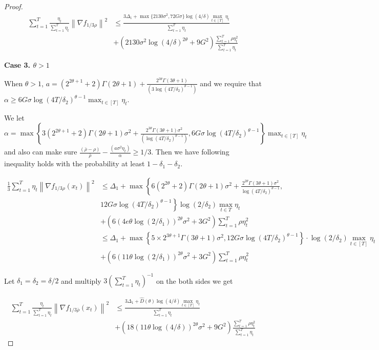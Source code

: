 \documentclass{article}
\def \brho {\bar{\rho}}
\def \sumT {\sum_{t=1}^T}
\def \nab {\nabla}
\newcommand{\norm}[2][]{\left\|#2\right\|^{#1}}
\newcommand{\Brace}[1]{\left(#1\right)}
\begin{document}
\begin{proof}
\begin{align}
    \sumT \frac{\eta_t}{\sumT\eta_t}\norm[2]{\nab f_{1/3\rho}}&\leq \frac{3\Delta_1+\max\{2130\sigma^2,72G\sigma\}\log(4/\delta)\max_{t\in[T]}\eta_t}{\sumT\eta_t}\nonumber\\
    &+ (2130\sigma^2\log(4/\delta)^{2\theta}+9G^2)\frac{\sumT\rho\eta_t^2}{\sumT\eta_t}
\end{align}

\textbf{Case 3. $\theta>1$}

When $\theta>1$, $a=(2^{2\theta+1}+2)\Gamma(2\theta+1)+\frac{2^{3\theta}\Gamma(3\theta+1)}{(3\log(4T/\delta_2)^{\theta-1})}$ and we require that $\alpha\geq 6G\sigma\log(4T/\delta_2)^{\theta-1}\max_{t\in[T]}\eta_t$. 

We let $\alpha = \max\left\{3(2^{2\theta+1}+2)\Gamma(2\theta+1)\sigma^2+\frac{2^{3\theta}\Gamma(3\theta+1)\sigma^2}{(\log(4T/\delta_2)^{\theta-1})},6G\sigma\log(4T/\delta_2)^{\theta-1}\right\}\max_{t\in[T]}\eta_t$ and also can make sure $\frac{(\brho-\rho)}{\brho} - \frac{(a\sigma^2\eta_t)}{\alpha}\geq1/3$. Then we have following inequality holds with the probability at least $1-\delta_1-\delta_2$.

\begin{align}
    \frac{1}{3}\sumT \eta_t\norm[2]{\nab f_{1/3\rho}(x_t)}&\leq \Delta_1 + \max\left\{6(2^{2\theta}+2)\Gamma(2\theta+1)\sigma^2+\frac{2^{2\theta}\Gamma(3\theta+1)\sigma^2}{\log(4T/\delta_2)^{\theta-1}}, \right.\nonumber\\
    &\left.12G\sigma\log(4T/\delta_2)^{\theta-1}\right\}\log(2/\delta_2)\max_{t\in T}\eta_t\nonumber\\
    &+\Brace{6(4e\theta\log(2/\delta_1))^{2\theta}\sigma^2+3G^2}\sumT \rho\eta_t^2\nonumber\\
    &\leq \Delta_1 + \max\left\{5\times2^{3\theta+1}\Gamma(3\theta+1)\sigma^2,12G\sigma\log(4T/\delta_2)^{\theta-1}\right\}\cdot\log(2/\delta_2)\max_{t\in[T]}\eta_t\nonumber\\
    &+ \Brace{6(11\theta\log(2/\delta_1))^{2\theta}\sigma^2+3G^2}\sumT \rho\eta_t^2
\end{align}

Let $\delta_1=\delta_2=\delta/2$ and multiply $3\Brace{\sumT\eta_t}^{-1}$ on the both sides we get

\begin{align}
    \sumT\frac{\eta_t}{\sumT\eta_t}\norm[2]{\nab f_{1/3\brho}(x_t)}&\leq\frac{3\Delta_1+\widehat{D}(\theta)\log(4/\delta)\max_{t\in[T]}\eta_t}{\sumT\eta_t}\nonumber\\
    &+ \Brace{18(11\theta\log(4/\delta))^{2\theta}\sigma^2+9G^2}\frac{\sumT\rho\eta_t^2  }{\sumT\eta_t}
\end{align}

\end{proof}
\end{document}
